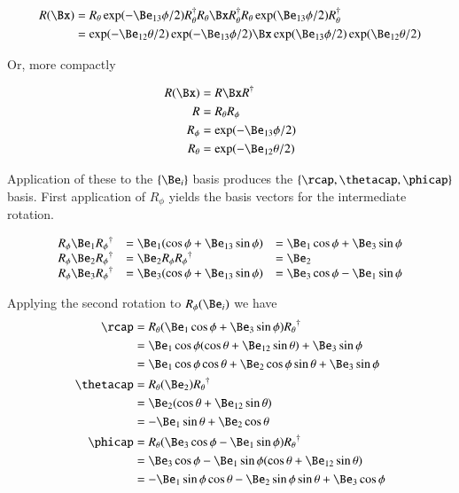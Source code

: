 \begin{align*}
R(\Bx) 
&= R_\theta \exp( - \Be_{13} \phi/2 ) R_\theta^\dagger R_\theta \Bx R_\theta^\dagger R_\theta \exp( \Be_{13} \phi/2 ) R_\theta^\dagger \\
&= \exp( - \Be_{12} \theta/2 ) \exp( - \Be_{13} \phi/2 ) \Bx \exp( \Be_{13} \phi/2 ) \exp( \Be_{12} \theta/2 ) \\
\end{align*}

Or, more compactly

\begin{align}
R(\Bx) &= R \Bx R^\dagger \\
R &= R_\theta R_\phi \\
R_\phi &= \exp(-\Be_{13}\phi/2) \\
R_\theta &= \exp(-\Be_{12}\theta/2)
\end{align}

Application of these to the $\{\Be_i\}$ basis produces the $\{\rcap, \thetacap, \phicap\}$ basis.  First application 
of $R_\phi$ yields the basis vectors for the intermediate rotation.

\begin{align*}
\begin{array}{l l l}
{R_\phi}\Be_1 {R_\phi}^\dagger &= \Be_1 (\cos\phi + \Be_{13} \sin\phi) &= \Be_1 \cos\phi + \Be_3 \sin\phi \\
{R_\phi}\Be_2 {R_\phi}^\dagger &= \Be_2 R_\phi {R_\phi}^\dagger &= \Be_2 \\
{R_\phi}\Be_3 {R_\phi}^\dagger &= \Be_3 (\cos\phi + \Be_{13} \sin\phi) &= \Be_3 \cos\phi - \Be_1 \sin\phi \\
\end{array}
\end{align*}

Applying the second rotation to $R_\phi(\Be_i)$ we have
\begin{align*}
\rcap 
&= {R_\theta}( \Be_1 \cos\phi + \Be_3 \sin\phi ) {R_\theta}^\dagger \\
&=
\Be_1 \cos\phi (\cos\theta + \Be_{12} \sin\theta)
+ \Be_3 \sin\phi \\
&=
\Be_1 \cos\phi \cos\theta 
+ \Be_2 \cos\phi \sin\theta
+ \Be_3 \sin\phi \\
\thetacap
&= {R_\theta} ( \Be_2 ) {R_\theta}^\dagger \\
&= \Be_2 (\cos\theta + \Be_{12} \sin\theta) \\
&= - \Be_1 \sin\theta + \Be_2 \cos\theta \\
\phicap
&= {R_\theta} ( \Be_3 \cos\phi - \Be_1 \sin\phi ) {R_\theta}^\dagger \\
&= \Be_3 \cos\phi - \Be_1 \sin\phi (\cos\theta + \Be_{12} \sin\theta) \\
&= 
- \Be_1 \sin\phi \cos\theta 
- \Be_2 \sin\phi \sin\theta 
+ \Be_3 \cos\phi
\\
\end{align*}

